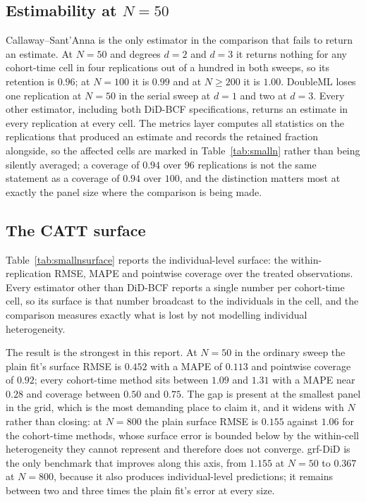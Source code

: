 \documentclass[11pt]{article}
\begin{document}
\subsection{Estimability at $N=50$}

Callaway--Sant'Anna is the only estimator in the comparison that fails to
return an estimate. At $N=50$ and degrees $d=2$ and $d=3$ it returns nothing
for any cohort-time cell in four replications out of a hundred in both sweeps,
so its retention is $0.96$; at $N=100$ it is $0.99$ and at $N\geq200$ it is
$1.00$. DoubleML loses one replication at $N=50$ in the serial sweep at $d=1$ and
two at $d=3$. Every other estimator, including both DiD-BCF
specifications, returns an estimate in every replication at every cell. The
metrics layer computes all statistics on the replications that produced an
estimate and records the retained fraction alongside, so the affected cells
are marked in Table~\ref{tab:smalln} rather than being silently averaged; a
coverage of $0.94$ over $96$ replications is not the same statement as a
coverage of $0.94$ over $100$, and the distinction matters most at exactly the
panel size where the comparison is being made.

\subsection{The CATT surface}

Table~\ref{tab:smallnsurface} reports the individual-level surface: the
within-replication RMSE, MAPE and pointwise coverage over the treated
observations. Every estimator other than DiD-BCF reports a single number per
cohort-time cell, so its surface is that number broadcast to the individuals
in the cell, and the comparison measures exactly what is lost by not modelling
individual heterogeneity.

The result is the strongest in this report. At $N=50$ in the ordinary sweep
the plain fit's surface RMSE is $0.452$ with a MAPE of $0.113$ and pointwise
coverage of $0.92$; every cohort-time method sits between $1.09$ and $1.31$
with a MAPE near $0.28$ and coverage between $0.50$ and $0.75$. The gap is
present at the smallest panel in the grid, which is the most demanding place
to claim it, and it widens with $N$ rather than closing: at $N=800$ the plain
surface RMSE is $0.155$ against $1.06$ for the cohort-time methods, whose
surface error is bounded below by the within-cell heterogeneity they cannot
represent and therefore does not converge. grf-DiD is the only benchmark that
improves along this axis, from $1.155$ at $N=50$ to $0.367$ at $N=800$,
because it also produces individual-level predictions; it remains between two and three times the plain fit's error at every
size.
\end{document}

